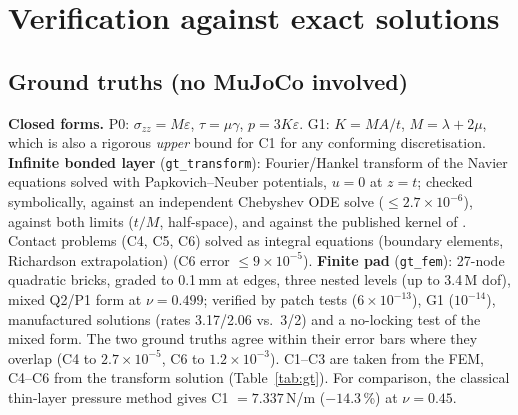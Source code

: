 \documentclass[10pt,twocolumn]{article}
\newcommand{\code}[1]{\texttt{\small #1}}
\newcommand{\Nu}{N/\textmu m}
\begin{document}
\section{Verification against exact solutions}
\label{sec:verify}
\subsection{Ground truths (no MuJoCo involved)}
\textbf{Closed forms.} P0: $\sigma_{zz}=M\varepsilon$, $\tau=\mu\gamma$, $p=3K\varepsilon$. G1:
$K=MA/t$, $M=\lambda+2\mu$, which is also a rigorous \emph{upper} bound for C1 for any conforming discretisation.
\textbf{Infinite bonded layer} (\code{gt\_transform}): Fourier/Hankel transform of the Navier equations solved with
Papkovich--Neuber potentials, $u=0$ at $z=t$; checked symbolically, against an independent Chebyshev ODE solve
($\le2.7\times10^{-6}$), against both limits ($t/M$, half-space), and against the published kernel of
\cite{argatov}. Contact problems (C4, C5, C6) solved as integral equations (boundary elements, Richardson extrapolation) (C6 error
$\le9\times10^{-5}$). \textbf{Finite pad} (\code{gt\_fem}): 27-node quadratic bricks, graded to 0.1\,mm at edges,
three nested levels (up to 3.4\,M dof), mixed Q2/P1 form at $\nu=0.499$; verified by patch tests ($6\times10^{-13}$),
G1 ($10^{-14}$), manufactured solutions (rates 3.17/2.06 vs.\ 3/2) and a no-locking test of the mixed form. The two
ground truths agree within their error bars where they overlap (C4 to $2.7\times10^{-5}$, C6 to $1.2\times10^{-3}$).
C1--C3 are taken from the FEM, C4--C6 from the transform solution (Table~\ref{tab:gt}). For comparison, the classical thin-layer pressure method \cite{kelly} gives C1 $=7.337$\,\Nu{} ($-14.3$\,\%) at $\nu=0.45$.
\end{document}
